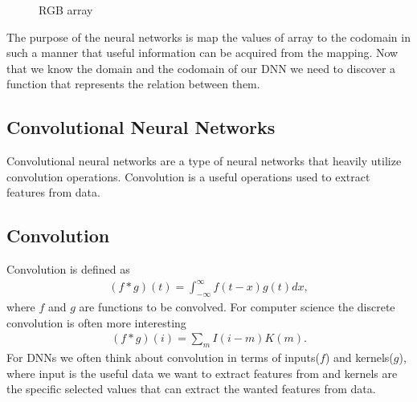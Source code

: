 \documentclass[12pt,a4paper,english
]{tunithesis}
\begin{document}
\begin{figure}
  \centering
  \caption{RGB array}
  \label{fig:rgb-array}
\end{figure}

The purpose of the neural networks is map the values of array to the codomain in such a manner that useful information can be acquired from the mapping.
Now that we know the domain and the codomain of our DNN we need to discover a function that represents the relation between them.

\subsection{Convolutional Neural Networks}
Convolutional neural networks are a type of neural networks that heavily utilize convolution operations. Convolution is a useful operations used to extract features from data.


\subsection{Convolution}
Convolution is defined as
\begin{align}
  (f \ast g)(t) = \int_{-\infty}^{\infty}f(t-x)g(t)dx,
\end{align}
where $f$ and $g$ are functions to be convolved. For computer science the discrete convolution is often more interesting
\begin{align}
  (f \ast g)(i) = \sum_{m}I(i-m)K(m).
\end{align}
For DNNs we often think about convolution in terms of inputs($f$) and kernels($g$), where input is the useful data we want to extract features from and kernels are the specific selected values that can extract the wanted features from data.
\end{document}
